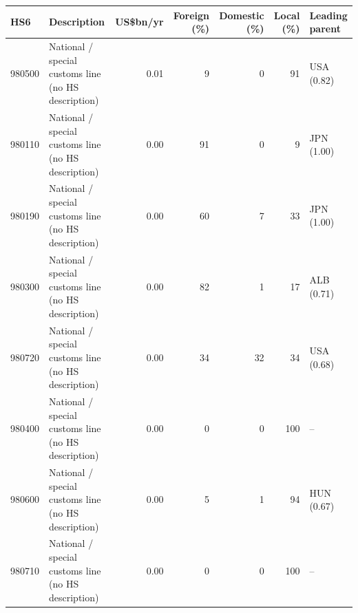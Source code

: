 \begin{tabular}{@{}l p{6.4cm} r r r r l@{}}
\toprule
HS6 & Description & US\$bn/yr & Foreign (\%) & Domestic (\%) & Local (\%) & Leading parent \\
\midrule
980500 & National /\allowbreak{} special customs line (no HS description) & 0.01 & 9 & 0 & 91 & USA (0.82) \\
980110 & National /\allowbreak{} special customs line (no HS description) & 0.00 & 91 & 0 & 9 & JPN (1.00) \\
980190 & National /\allowbreak{} special customs line (no HS description) & 0.00 & 60 & 7 & 33 & JPN (1.00) \\
980300 & National /\allowbreak{} special customs line (no HS description) & 0.00 & 82 & 1 & 17 & ALB (0.71) \\
980720 & National /\allowbreak{} special customs line (no HS description) & 0.00 & 34 & 32 & 34 & USA (0.68) \\
980400 & National /\allowbreak{} special customs line (no HS description) & 0.00 & 0 & 0 & 100 & -- \\
980600 & National /\allowbreak{} special customs line (no HS description) & 0.00 & 5 & 1 & 94 & HUN (0.67) \\
980710 & National /\allowbreak{} special customs line (no HS description) & 0.00 & 0 & 0 & 100 & -- \\
\bottomrule
\end{tabular}
